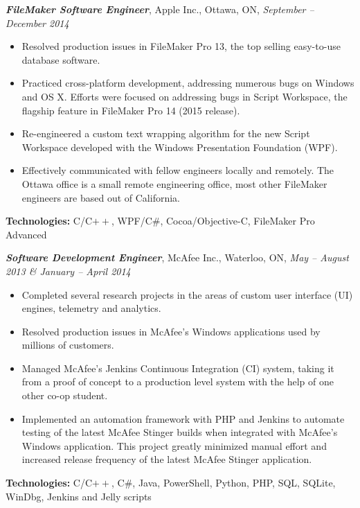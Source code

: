\documentclass[10pt,letterpaper]{article}
\newcommand{\job}[4]
{
    \emph{\textbf{#1}}, #2, #3, \emph{#4}
}
\begin{document}
\newpage
\job{FileMaker Software Engineer}{Apple Inc.}{Ottawa, ON}{September -- December  2014}\\
\begin{adjustwidth}{0.1in}{0.5in}
    \begin{itemize}
    \item Resolved production issues in FileMaker Pro 13, the top selling easy-to-use database software.
    \item Practiced cross-platform development, addressing numerous bugs on Windows and OS X. Efforts were focused on addressing bugs in Script Workspace, the flagship feature in FileMaker Pro 14 (2015 release).
    \item Re-engineered a custom text wrapping algorithm for the new Script Workspace developed with the Windows Presentation Foundation (WPF).
    \item Effectively communicated with fellow engineers locally and remotely. The Ottawa office is a small remote engineering office, most other FileMaker engineers are based out of California.
    \end{itemize}
    \vspace{0.5em}
    \textbf{Technologies:} C/C$++$, WPF/C\#, Cocoa/Objective-C, FileMaker Pro Advanced
\end{adjustwidth}
\vspace{0.8em}
\job{Software Development Engineer}{McAfee Inc.}{Waterloo, ON}{ May -- August 2013 \& January -- April 2014 }\\
\begin{adjustwidth}{0.1in}{0.5in}
    \begin{itemize}
	\item Completed several research projects in the areas of custom user interface (UI) engines, telemetry and analytics.
	\item Resolved production issues in McAfee's Windows applications used by millions of customers.
	\item Managed McAfee's Jenkins Continuous Integration (CI) system, taking it from a proof of concept to a production level system with the help of one other co-op student.
	\item Implemented an automation framework with PHP and Jenkins to automate testing of the latest McAfee Stinger builds when integrated
	    with McAfee's Windows application. This project greatly minimized manual effort and increased release frequency of the latest McAfee Stinger application.
    \end{itemize}
    \vspace{0.5em}
    \textbf{Technologies:} C/C$++$, C\#, Java, PowerShell, Python, PHP, SQL, SQLite, WinDbg, Jenkins and Jelly scripts
\end{adjustwidth}
\end{document}
